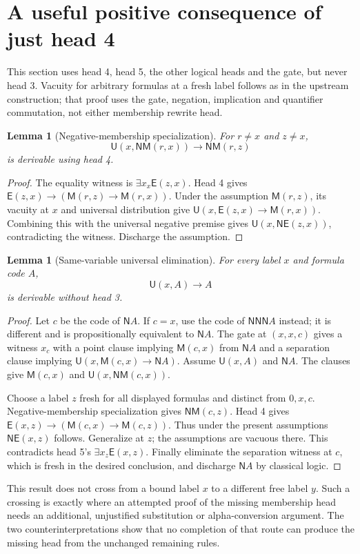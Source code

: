 \documentclass[10pt]{article}
\newtheorem{lemma}[theorem]{Lemma}
\newcommand{\M}{\mathsf M}
\newcommand{\U}{\mathsf U}
\newcommand{\E}{\mathsf E}
\newcommand{\N}{\mathsf N}
\begin{document}
\section{A useful positive consequence of just head 4}

This section uses head 4, head 5, the other logical heads and the gate,
but never head 3.  Vacuity for arbitrary formulas at a fresh label
follows as in the upstream construction; that proof uses the gate,
negation, implication and quantifier commutation, not either
membership rewrite head.

\begin{lemma}[Negative-membership specialization]
For $r\ne x$ and $z\ne x$,
\[
 \U(x,\N\M(r,x))\to\N\M(r,z)
\]
is derivable using head 4.
\end{lemma}
\begin{proof}
The equality witness is $\exists x_x\E(z,x)$.  Head 4 gives
$\E(z,x)\to(\M(r,z)\to\M(r,x))$.  Under the assumption
$\M(r,z)$, its vacuity at $x$ and universal distribution give
$\U(x,\E(z,x)\to\M(r,x))$.  Combining this with the universal
negative premise gives $\U(x,\N\E(z,x))$, contradicting the
witness.  Discharge the assumption.
\end{proof}

\begin{lemma}[Same-variable universal elimination]
For every label $x$ and formula code $A$,
\[
 \U(x,A)\to A
\]
is derivable without head 3.
\end{lemma}
\begin{proof}
Let $c$ be the code of $\N A$.  If $c=x$, use the code of
$\N\N\N A$ instead; it is different and is propositionally
equivalent to $\N A$.  The gate at $(x,x,c)$ gives a witness
$x_c$ with a point clause implying $\M(c,x)$ from $\N A$ and
a separation clause implying
$\U(x,\M(c,x)\to\N A)$.
Assume $\U(x,A)$ and $\N A$.  The clauses give $\M(c,x)$ and
$\U(x,\N\M(c,x))$.

Choose a label $z$ fresh for all displayed formulas and distinct from
$0,x,c$.  Negative-membership specialization gives $\N\M(c,z)$.
Head 4 gives $\E(x,z)\to(\M(c,x)\to\M(c,z))$.  Thus under the
present assumptions $\N\E(x,z)$ follows.  Generalize at $z$;
the assumptions are vacuous there.  This contradicts head 5's
$\exists x_z\E(x,z)$.  Finally eliminate the separation witness
at $c$, which is fresh in the desired conclusion, and discharge
$\N A$ by classical logic.
\end{proof}

This result does not cross from a bound label $x$ to a different
free label $y$.  Such a crossing is exactly where an attempted
proof of the missing membership head needs an additional,
unjustified substitution or alpha-conversion argument.  The two
counterinterpretations show that no completion of that route can
produce the missing head from the unchanged remaining rules.
\end{document}
